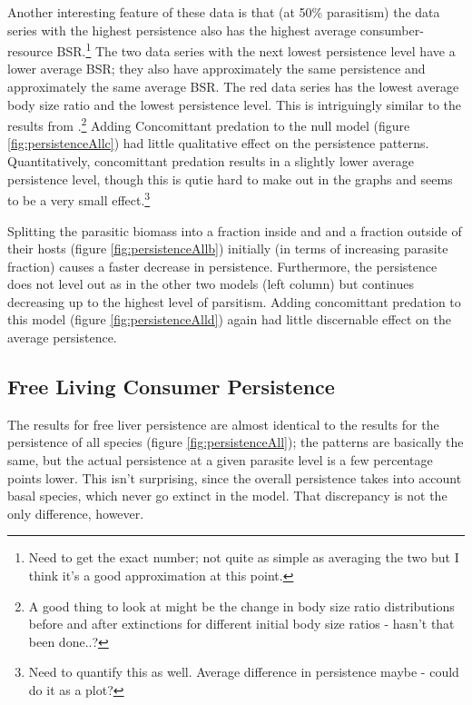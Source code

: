 \documentclass[11pt]{amsart}
\begin{document}
Another interesting feature of these data is that (at 50\% parasitism) the data series with the highest persistence also has the highest average consumber-resource BSR.\footnote{Need to get the exact number; not quite as simple as averaging the two but I think it's a good approximation at this point.}  The two data series with the next lowest persistence level have a lower average BSR; they also have approximately the same persistence and approximately the same average BSR.  The red data series has the lowest average body size ratio and the lowest persistence level.  This is intriguingly similar to the results from \cite{Brose2006}.\footnote{A good thing to look at might be the change in body size ratio distributions before and after extinctions for different initial body size ratios - hasn't that been done..?} 
Adding Concomittant predation to the null model (figure \ref{fig:persistenceAllc}) had little qualitative effect on the persistence patterns.  Quantitatively, concomittant predation results in a slightly lower average persistence level, though this is qutie hard to make out in the graphs and seems to be a very small effect.\footnote{Need to quantify this as well.  Average difference in persistence maybe - could do it as a plot?}

Splitting the parasitic biomass into a fraction inside and and a fraction outside of their hosts (figure \ref{fig:persistenceAllb}) initially (in terms of increasing parasite fraction) causes a faster decrease in persistence.  
Furthermore, the persistence does not level out as in the other two models (left column) but continues decreasing up to the highest level of parsitism.  Adding concomittant predation to this model (figure \ref{fig:persistenceAlld}) again had little discernable effect on the average persistence.



\subsection{Free Living Consumer Persistence \label{sec:persistenceFree}}

The results for free liver persistence are almost identical to the results for the persistence of all species (figure \ref{fig:persistenceAll}); the patterns are basically the same, but the actual persistence at a given parasite level is a few percentage points lower.  This isn't surprising, since the overall persistence takes into account basal species, which never go extinct in the model.  That discrepancy is not the only difference, however.
\end{document}
